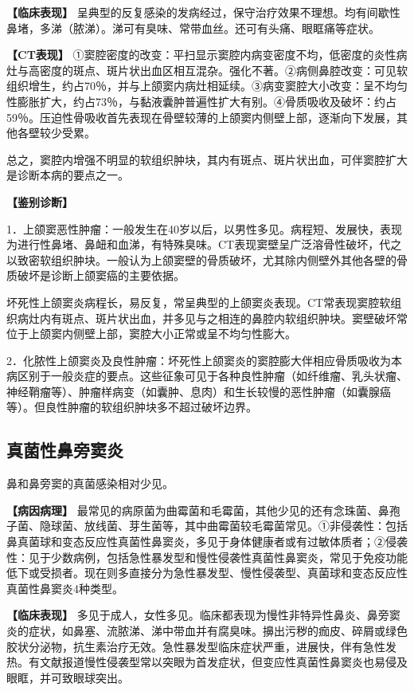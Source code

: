 \textbf{【临床表现】}
呈典型的反复感染的发病经过，保守治疗效果不理想。均有间歇性鼻堵，多涕（脓涕）。涕可有臭味、常带血丝。还可有头痛、眼眶痛等症状。

\textbf{【CT表现】}
①窦腔密度的改变：平扫显示窦腔内病变密度不均，低密度的炎性病灶与高密度的斑点、斑片状出血区相互混杂。强化不著。②病侧鼻腔改变：可见软组织增生，约占70％，并与上颌窦内病灶相延续。③病变窦腔大小改变：呈不均匀性膨胀扩大，约占73％，与黏液囊肿普遍性扩大有别。④骨质吸收及破坏：约占59％。压迫性骨吸收首先表现在骨壁较薄的上颌窦内侧壁上部，逐渐向下发展，其他各壁较少受累。

总之，窦腔内增强不明显的软组织肿块，其内有斑点、斑片状出血，可伴窦腔扩大是诊断本病的要点之一。

\textbf{【鉴别诊断】}

1．上颌窦恶性肿瘤：一般发生在40岁以后，以男性多见。病程短、发展快，表现为进行性鼻堵、鼻衄和血涕，有特殊臭味。CT表现窦壁呈广泛溶骨性破坏，代之以致密软组织肿块。一般认为上颌窦壁的骨质破坏，尤其除内侧壁外其他各壁的骨质破坏是诊断上颌窦癌的主要依据。

坏死性上颌窦炎病程长，易反复，常呈典型的上颌窦炎表现。CT常表现窦腔软组织病灶内有斑点、斑片状出血，并多见与之相连的鼻腔内软组织肿块。窦壁破坏常位于上颌窦内侧壁上部，窦腔大小正常或呈不均匀性膨大。

2．化脓性上颌窦炎及良性肿瘤：坏死性上颌窦炎的窦腔膨大伴相应骨质吸收为本病区别于一般炎症的要点。这些征象可见于各种良性肿瘤（如纤维瘤、乳头状瘤、神经鞘瘤等）、肿瘤样病变（如囊肿、息肉）和生长较慢的恶性肿瘤（如囊腺癌等）。但良性肿瘤的软组织肿块多不超过破坏边界。

\subsection{真菌性鼻旁窦炎}

鼻和鼻旁窦的真菌感染相对少见。

\textbf{【病因病理】}
最常见的病原菌为曲霉菌和毛霉菌，其他少见的还有念珠菌、鼻孢子菌、隐球菌、放线菌、芽生菌等，其中曲霉菌较毛霉菌常见。①非侵袭性：包括鼻真菌球和变态反应性真菌性鼻窦炎，多见于身体健康者或有过敏体质者；②侵袭性：见于少数病例，包括急性暴发型和慢性侵袭性真菌性鼻窦炎，常见于免疫功能低下或受损者。现在则多直接分为急性暴发型、慢性侵袭型、真菌球和变态反应性真菌性鼻窦炎4种类型。

\textbf{【临床表现】}
多见于成人，女性多见。临床都表现为慢性非特异性鼻炎、鼻旁窦炎的症状，如鼻塞、流脓涕、涕中带血并有腐臭味。擤出污秽的痂皮、碎屑或绿色胶状分泌物，抗生素治疗无效。急性暴发型临床症状严重，进展快，伴有急性发热。有文献报道慢性侵袭型常以突眼为首发症状，但变应性真菌性鼻窦炎也易侵及眼眶，并可致眼球突出。

